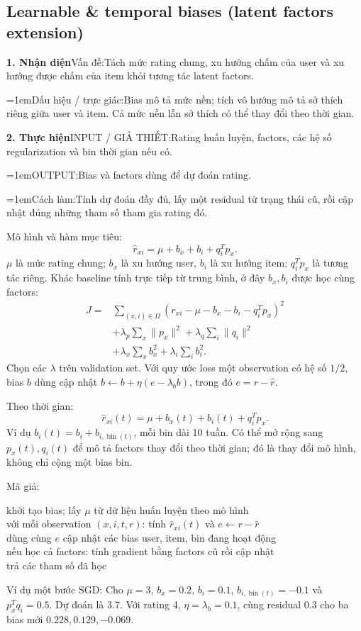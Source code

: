 \documentclass[10pt,a4paper,twocolumn]{article}
\makeatletter
\newif\ifexamheadingprinted
\newcommand{\topic}[2]{%
  \global\examheadingprintedfalse\par\subsection{#2}\label{topic:#1}}
\newcommand{\key}[1]{#1:\enspace}
\newcommand{\algfield}[2]{\par\noindent\hangindent=1em\relax#1:\enspace#2}
\newcommand{\unitfield}[4]{%
  \par\noindent\textbf{#1. #2}\enspace #3:\enspace #4}
\newcommand{\algsummary}[6]{%
  \begingroup\setlength{\parskip}{1pt}%
  \unitfield{1}{Nhận diện}{Vấn đề}{#1}%
  \algfield{Dấu hiệu / trực giác}{#2}%
  \if\relax\detokenize{#3}\relax\else\par\noindent#3\par\fi%
  \unitfield{2}{Thực hiện}{INPUT / GIẢ THIẾT}{#4}%
  \algfield{OUTPUT}{#5}%
  \algfield{Cách làm}{#6}\par\endgroup}
\newenvironment{algpseudo}{%
  \par\addvspace{2pt}\noindent
  \setlength{\parskip}{0pt}%
  Mã giả:\par\nobreak
  \begin{list}{}{\setlength{\leftmargin}{1em}\setlength{\topsep}{0pt}%
    \setlength{\partopsep}{0pt}\setlength{\parsep}{0pt}%
    \@beginparpenalty=10000\relax}%
  \item\relax
}{\end{list}\par\addvspace{3pt}}
\makeatother
\begin{document}
\topic{biases}{Learnable \& temporal biases (latent factors extension)}

\algsummary{Tách mức rating chung, xu hướng chấm của user và xu hướng được chấm của item khỏi tương tác latent factors.}{Bias mô tả mức nền; tích vô hướng mô tả sở thích riêng giữa user và item. Cả mức nền lẫn sở thích có thể thay đổi theo thời gian.}{}{Rating huấn luyện, factors, các hệ số regularization và bin thời gian nếu có.}{Bias và factors dùng để dự đoán rating.}{Tính dự đoán đầy đủ, lấy một residual từ trạng thái cũ, rồi cập nhật đúng những tham số tham gia rating đó.}

\key{Mô hình và hàm mục tiêu}
\[
\hat r_{xi}=\mu+b_x+b_i+q_i^Tp_x.
\]
$\mu$ là mức rating chung; $b_x$ là xu hướng user, $b_i$ là xu hướng item; $q_i^Tp_x$ là tương tác riêng. Khác baseline tính trực tiếp từ trung bình, ở đây $b_x,b_i$ được học cùng factors:
\begin{align*}
J={}&\sum_{(x,i)\in\Omega}(r_{xi}-\mu-b_x-b_i-q_i^Tp_x)^2\\
&+\lambda_p\sum_x\|p_x\|^2+\lambda_q\sum_i\|q_i\|^2\\
&+\lambda_x\sum_xb_x^2+\lambda_i\sum_ib_i^2.
\end{align*}
Chọn các $\lambda$ trên validation set. Với quy ước loss một observation có hệ số $1/2$, bias $b$ dùng cập nhật $b\gets b+\eta(e-\lambda_b b)$, trong đó $e=r-\hat r$.

\key{Theo thời gian}
\[
\hat r_{xi}(t)=\mu+b_x(t)+b_i(t)+q_i^Tp_x.
\]
Ví dụ $b_i(t)=b_i+b_{i,\operatorname{bin}(t)}$, mỗi bin dài 10 tuần. Có thể mở rộng sang $p_x(t),q_i(t)$ để mô tả factors thay đổi theo thời gian; đó là thay đổi mô hình, không chỉ cộng một bias bin.

\begin{algpseudo}
khởi tạo bias; lấy $\mu$ từ dữ liệu huấn luyện theo mô hình\\
với mỗi observation $(x,i,t,r)$: tính $\hat r_{xi}(t)$ và $e\gets r-\hat r$\\
\quad dùng cùng $e$ cập nhật các bias user, item, bin đang hoạt động\\
\quad nếu học cả factors: tính gradient bằng factors cũ rồi cập nhật\\
trả các tham số đã học
\end{algpseudo}

\key{Ví dụ một bước SGD} Cho $\mu=3$, $b_x=0.2$, $b_i=0.1$, $b_{i,\operatorname{bin}(t)}=-0.1$ và $p_x^Tq_i=0.5$. Dự đoán là $3.7$. Với rating 4, $\eta=\lambda_b=0.1$, cùng residual $0.3$ cho ba bias mới $0.228,0.129,-0.069$.
\end{document}
